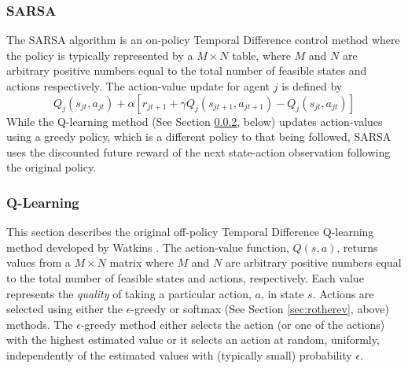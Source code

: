 \subsubsection{SARSA}
\label{sec:sarsa}
%
%
The SARSA algorithm is an on-policy Temporal Difference control method where
the policy is typically represented by a $M \times N$ table, where $M$ and $N$
are arbitrary positive numbers equal to the total number of feasible states and
actions respectively.  The action-value update for agent $j$ is defined by
\begin{equation}
Q_j(s_{jt},a_{jt}) + \alpha [r_{jt+1} + \gamma Q_j(s_{jt+1},a_{jt+1}) -
Q_j(s_{jt},a_{jt})]
\end{equation}
While the Q-learning method (See Section \ref{sec:qlearning}, below) updates
action-values using a greedy policy, which is a different policy to that being
followed, SARSA uses the discounted future reward of the next state-action
observation following the original policy.

\subsubsection{Q-Learning}
\label{sec:qlearning}
This section describes the original off-policy Temporal Difference Q-learning
method developed by Watkins \cite{watkins:1989}.  The action-value function,
$Q(s,a)$, returns values from a $M \times N$ matrix where $M$ and $N$ are
arbitrary positive numbers equal to the total number of feasible states and
actions, respectively.  Each value represents the \textit{quality} of taking a
particular action, $a$, in state $s$.  Actions are selected using either the
$\epsilon$-greedy or softmax (See Section \ref{sec:rotherev}, above) methods.
The $\epsilon$-greedy method either selects the action (or one of the actions)
with the highest estimated value or it selects an action at random, uniformly,
independently of the estimated values with (typically small) probability
$\epsilon$.

